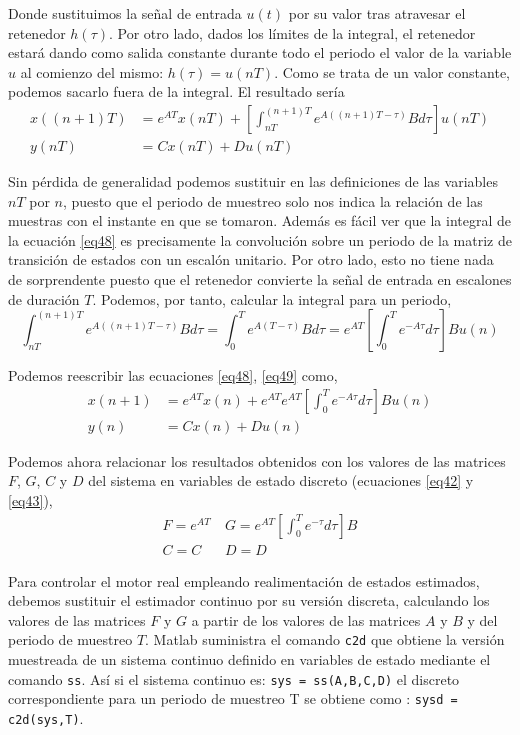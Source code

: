 \documentclass[10pt,a4paper]{report}
\begin{document}
Donde sustituimos la señal de entrada $u(t)$ por su valor tras atravesar el retenedor $h(\tau)$. Por otro lado, dados los límites de la integral, el retenedor estará dando como salida constante durante todo el periodo el valor de la variable $u$ al comienzo del mismo: $h(\tau) = u(nT)$. Como se trata de un valor constante, podemos sacarlo fuera de la integral. El resultado sería
\begin{align}
x((n+1)T) &= e^{AT}x(nT) + \left[\int_{nT}^{(n+1)T} e^{A((n+1)T-\tau)}Bd\tau\right] u(nT) \label{eq48}\\ 
y(nT) &= Cx(nT) + Du(nT) \label{eq49}
\end{align}

Sin pérdida de generalidad podemos sustituir en las definiciones de las variables $nT$ por $n$, puesto que el periodo de muestreo solo nos indica la relación de las muestras con el instante en que se tomaron. Además es fácil ver que la integral de la ecuación \ref{eq48} es precisamente la convolución sobre un periodo de la matriz de transición de estados con un escalón unitario. Por otro lado, esto no tiene nada de sorprendente puesto que el retenedor convierte la señal de entrada en escalones de duración $T$. Podemos, por tanto, calcular la integral para un periodo,
\begin{equation}
\int_{nT}^{(n+1)T} e^{A((n+1)T-\tau)}Bd\tau = \int_0^Te^{A(T-\tau)}Bd\tau = e^{AT}\left[\int_0^Te^{-A\tau}d\tau \right]Bu(n)
\end{equation}

Podemos reescribir las ecuaciones \ref{eq48}, \ref{eq49} como,
\begin{align}
x(n+1) &= e^{AT}x(n) + e^{AT}e^{AT}\left[\int_0^Te^{-A\tau}d\tau \right]Bu(n) \label{eq411}\\
y(n) &= Cx(n) + Du(n) \label{eq411}
\end{align}

Podemos  ahora relacionar los resultados obtenidos con los valores de las matrices $F$, $G$, $C$ y $D$ del sistema en variables de estado discreto (ecuaciones \ref{eq42} y \ref{eq43}), 
\begin{align}
F = e^{AT} & \ G = e^{AT}\left[\int_0^Te^{-\tau}d\tau \right]B\\
C = C\ \ \  & \ D=D
\end{align}

Para controlar el motor real empleando realimentación de estados estimados, debemos sustituir el estimador continuo por su versión discreta, calculando los valores de las matrices $F$ y $G$ a partir de los valores de las matrices $A$ y $B$ y del periodo de muestreo $T$. Matlab suministra el comando \texttt{c2d} que obtiene la versión muestreada de un sistema continuo definido en variables de estado mediante el comando \texttt{ss}. Así si el sistema continuo es: \texttt{sys = ss(A,B,C,D)} el discreto correspondiente para un periodo de muestreo T se obtiene como : \texttt{sysd = c2d(sys,T)}. 
\end{document}

